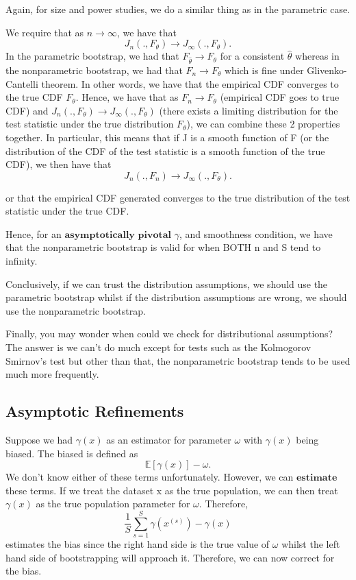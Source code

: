 \documentclass[twoside]{article}
\begin{document}
Again, for size and power studies, we do a similar thing as in the parametric case.

We require that as $n \rightarrow \infty$, we have that
$$
J_n(.,F_{\theta}) \rightarrow J_{\infty}(.,F_{\theta}).
$$
In the parametric bootstrap, we had that $F_{\hat{\theta}} \rightarrow F_{\theta}$ for a consistent $\hat{\theta}$ whereas in the nonparametric bootstrap, we had that $F_n \rightarrow F_{\theta}$ which is fine under Glivenko-Cantelli theorem. In other words, we have that the empirical CDF converges to the true CDF $F_{\theta}$. Hence, we have that as $F_n \rightarrow F_{\theta}$ (empirical CDF goes to true CDF) and $J_n(., F_{\theta}) \rightarrow J_{\infty}(., F_{\theta})$ (there exists a limiting distribution for the test statistic under the true distribution $F_{\theta}$), we can combine these 2 properties together. In particular, this means that if J is a smooth function of F (or the distribution of the CDF of the test statistic is a smooth function of the true CDF), we then have that
$$
J_n(., F_{n}) \rightarrow J_{\infty}(., F_{\theta}).
$$

or that the empirical CDF generated converges to the true distribution of the test statistic under the true CDF.

Hence, for an $\textbf{asymptotically pivotal}$ $\gamma$, and smoothness condition, we have that the nonparametric bootstrap is valid for when BOTH n and S tend to infinity.

Conclusively, if we can trust the distribution assumptions, we should use the parametric bootstrap whilst if the distribution assumptions are wrong, we should use the nonparametric bootstrap.

Finally, you may wonder when could we check for distributional assumptions? The answer is we can't do much except for tests such as the Kolmogorov Smirnov's test but other than that, the nonparametric bootstrap tends to be used much more frequently.

\subsection{Asymptotic Refinements}
Suppose we had $\gamma(x)$ as an estimator for parameter $\omega$ with $\gamma(x)$ being biased. The biased is defined as
$$
\mathbb{E}[\gamma(x)] - \omega.
$$
We don't know either of these terms unfortunately. However, we can $\textbf{estimate}$ these terms. If we treat the dataset x as the true population, we can then treat $\gamma(x)$ as the true population parameter for $\omega$. Therefore, 
$$
\frac{1}{S}\sum_{s=1}^S\gamma(x^{(s)}) - \gamma(x)
$$
estimates the bias since the right hand side is the true value of $\omega$ whilst the left hand side of bootstrapping will approach it. Therefore, we can now correct for the bias.
\end{document}
